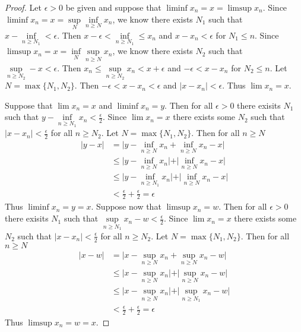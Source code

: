 \documentclass[12pt]{article}
\begin{document}
	\begin{proof}
		Let $\epsilon >0$ be given and suppose that $\liminf{x_n} = x = \limsup{x_n}$. Since $\liminf{x_n} = x = \sup\limits_N \inf\limits_{n \geq N}x_n$, we know there exists $N_1$ such that \\$x - \inf\limits_{n \geq N_1} < \epsilon$. Then $x - \epsilon < \inf\limits_{n \geq N_1} \leq x_n$ and $x - x_n < \epsilon$ for $N_1 \leq n$. Since $\limsup{x_n} = x = \inf\limits_N \sup\limits_{n \geq N}x_n$, we know there exists $N_2$ such that \\$\sup\limits_{n \geq N_2} - x < \epsilon$. Then $x_n \leq \sup\limits_{n \geq N_2}x_n < x + \epsilon$ and $-\epsilon < x - x_n$ for $N_2 \leq n$. Let $N = \max\{N_1,N_2\}$. Then $-\epsilon < x - x_n < \epsilon$ and $\vert x - x_n \vert < \epsilon$. Thus $\lim x_n = x$. \bigbreak
		
		Suppose that $\lim x_n = x$ and $\liminf x_n = y$. Then for all $\epsilon > 0$ there exisits $N_1$ such that $y -  \inf\limits_{n \geq N_1}x_n < \tfrac{\epsilon}{2}$. Since $\lim x_n = x$ there exists some $N_2$ such that $\vert x - x_n \vert < \tfrac{\epsilon}{2}$ for all $n \geq N_2$. Let $N = \max\{N_1,N_2\}$. Then for all $n \geq N$
		\begin{align*}
			\vert y - x \vert & = \vert y - \inf\limits_{n \geq N}x_n + \inf\limits_{n \geq N}x_n - x \vert \\
			& \leq \vert y - \inf\limits_{n \geq N}x_n \vert + \vert \inf\limits_{n \geq N}x_n - x \vert \\
			& \leq \vert y - \inf\limits_{n \geq N_1}x_n \vert + \vert \inf\limits_{n \geq N}x_n - x \vert \\
			& < \tfrac{\epsilon}{2} + \tfrac{\epsilon}{2} = \epsilon
		\end{align*}
		Thus $\liminf x_n = y = x$. \bigbreak
		Suppose now that $\limsup x_n = w$. Then for all $\epsilon > 0$ there exisits $N_1$ such that $\sup\limits_{n \geq N_1}x_n - w < \tfrac{\epsilon}{2}$. Since $\lim x_n = x$ there exists some $N_2$ such that $\vert x - x_n \vert < \tfrac{\epsilon}{2}$ for all $n \geq N_2$. Let $N = \max\{N_1,N_2\}$. Then for all $n \geq N$
		\begin{align*}
			\vert x - w \vert & = \vert x - \sup\limits_{n \geq N}x_n + \sup\limits_{n \geq N}x_n - w \vert \\
			& \leq \vert x - \sup\limits_{n \geq N}x_n \vert + \vert \sup\limits_{n \geq N}x_n - w \vert \\
			& \leq \vert x - \sup\limits_{n \geq N}x_n \vert + \vert \sup\limits_{n \geq N_1}x_n - w \vert \\
			& < \tfrac{\epsilon}{2} + \tfrac{\epsilon}{2} = \epsilon
		\end{align*}
		Thus $\limsup x_n = w = x$. \bigbreak
	\end{proof}
\end{document}
